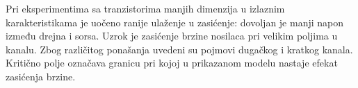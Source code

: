 Pri eksperimentima sa tranzistorima manjih dimenzija u izlaznim karakteristikama je uočeno ranije ulaženje u zasićenje: dovoljan je manji napon između drejna i sorsa. Uzrok je zasićenje brzine nosilaca pri velikim poljima u kanalu. Zbog različitog ponašanja uvedeni su pojmovi dugačkog i kratkog kanala. Kritično polje označava granicu pri kojoj u prikazanom modelu nastaje efekat zasićenja brzine.
